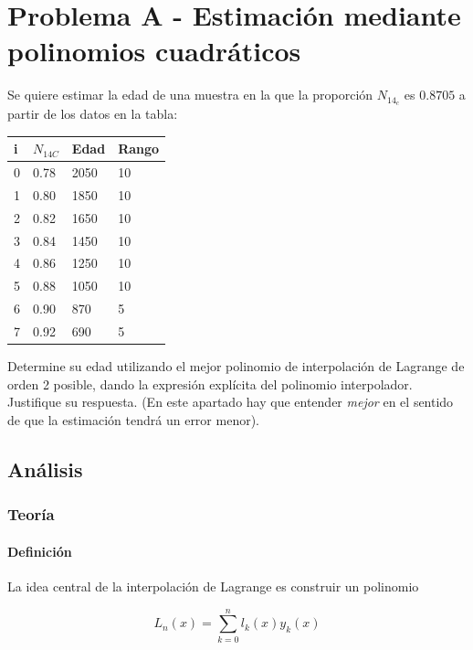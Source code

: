 
\section{Problema A - Estimación mediante polinomios cuadráticos}
Se quiere estimar la edad de una muestra en la que la proporción $N_{14_c}$ es $0.8705$ a partir de los datos en la tabla:


\begin{table}[H]
	\centering
	\begin{tabular}{llll}
		\hline
		i & $N_{14C}$ & Edad & Rango \\ \hline
		0 & 0.78   & 2050 & 10    \\
		1 & 0.80   & 1850 & 10    \\
		2 & 0.82   & 1650 & 10    \\
		3 & 0.84   & 1450 & 10    \\
		4 & 0.86   & 1250 & 10    \\
		5 & 0.88   & 1050 & 10    \\
		6 & 0.90   & 870  & 5     \\
		7 & 0.92   & 690  & 5     \\ \hline
	\end{tabular}
\end{table}


Determine su edad utilizando el mejor polinomio de interpolación de Lagrange de orden 2 posible, dando la expresión explícita del polinomio interpolador. Justifique su respuesta. (En este apartado hay que entender \textit{mejor} en el sentido de que la estimación tendrá un error menor).

\subsection{Análisis}

\subsubsection{Teoría}

\paragraph{Definición}
La idea central de la interpolación de Lagrange es construir un polinomio 

\begin{equation}
	L_n(x) = \sum_{k=0}^{n} l_k(x) y_k(x)
\end{equation}

